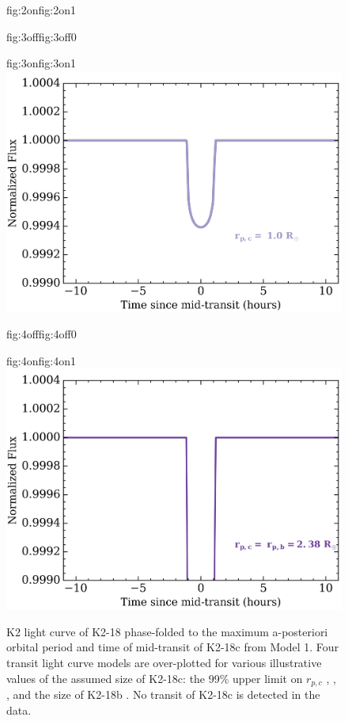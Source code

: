 \begin{figure}
\begin{ocg}{fig:2on}{fig:2on}{1}
  \end{ocg}%
  \hspace{-0.8\hsize}%
  \begin{ocg}{fig:3off}{fig:3off}{0}%
  \end{ocg}%
  \begin{ocg}{fig:3on}{fig:3on}{1}%
    \includegraphics[width=0.8\hsize]{figures/transits_3.png}%
  \end{ocg}%
  \hspace{-0.8\hsize}%
  \begin{ocg}{fig:4off}{fig:4off}{0}%
  \end{ocg}%
  \begin{ocg}{fig:4on}{fig:4on}{1}%
    \includegraphics[width=0.8\hsize]{figures/transits_4.png}%
  \end{ocg}%
  \caption[Search for transits of the RV planet K2-18c in the K2 photometry.]
      {\small K2 light curve of K2-18 phase-folded to the maximum a-posteriori orbital period
    and time of mid-transit of K2-18c from Model 1. Four transit light curve models are over-plotted
    for various illustrative values of the assumed size of K2-18c: the 99\% upper limit on $r_{p,c}$   
    , 
    ,
    , and the size of K2-18b
    . No transit of K2-18c is
    detected in the data.}
  \label{k218fig:transit}
\end{figure}


